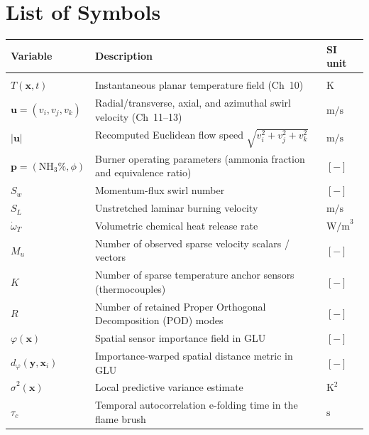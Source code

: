 \documentclass{Configuration_Files/PoliMi3i_thesis}
\begin{document}
\chapter*{List of Symbols}
\begin{table}[H]
    \centering
    \begin{tabularx}{\textwidth}{l X l}
        \textbf{Variable} & \textbf{Description} & \textbf{SI unit} \\\hline\\[-9px]
        $T(\mathbf{x}, t)$ & Instantaneous planar temperature field (Ch~10) & $\text{K}$ \\[2px]
        $\mathbf{u} = (v_i, v_j, v_k)$ & Radial/transverse, axial, and azimuthal swirl velocity (Ch~11--13) & $\text{m/s}$ \\[2px]
        $|\mathbf{u}|$ & Recomputed Euclidean flow speed $\sqrt{v_i^2 + v_j^2 + v_k^2}$ & $\text{m/s}$ \\[2px]
        $\mathbf{p} = (\text{NH}_3\%, \phi)$ & Burner operating parameters (ammonia fraction and equivalence ratio) & $[-]$ \\[2px]
        $S_w$ & Momentum-flux swirl number & $[-]$ \\[2px]
        $S_L$ & Unstretched laminar burning velocity & $\text{m/s}$ \\[2px]
        $\dot{\omega}_T$ & Volumetric chemical heat release rate & $\text{W/m}^3$ \\[2px]
        $M_u$ & Number of observed sparse velocity scalars / vectors & $[-]$ \\[2px]
        $K$ & Number of sparse temperature anchor sensors (thermocouples) & $[-]$ \\[2px]
        $R$ & Number of retained Proper Orthogonal Decomposition (POD) modes & $[-]$ \\[2px]
        $\varphi(\mathbf{x})$ & Spatial sensor importance field in GLU & $[-]$ \\[2px]
        $d_\varphi(\mathbf{y}, \mathbf{x}_i)$ & Importance-warped spatial distance metric in GLU & $[-]$ \\[2px]
        $\hat{\sigma}^2(\mathbf{x})$ & Local predictive variance estimate & $\text{K}^2$ \\[2px]
        $\tau_c$ & Temporal autocorrelation e-folding time in the flame brush & $\text{s}$ \\[2px]
    \end{tabularx}
\end{table}

\cleardoublepage
\end{document}
